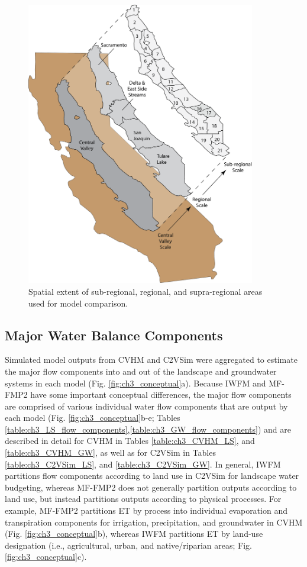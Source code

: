 \begin{figure}[ht!]
\centerline{\includegraphics[width=100mm,keepaspectratio]{ch3_figs/CV_subregions_fig_Alvar_040819.png}}
\caption{Spatial extent of sub-regional, regional, and supra-regional areas used for model comparison.}
\label{fig:ch3_regions}
\end{figure}

\subsection{Major Water Balance Components}

Simulated model outputs from CVHM and C2VSim were aggregated to estimate the major flow components into and out of the landscape and groundwater systems in each model (Fig. \ref{fig:ch3_conceptual}a). Because IWFM and MF-FMP2 have some important conceptual differences, the major flow components are comprised of various individual water flow components that are output by each model (Fig. \ref{fig:ch3_conceptual}b-e; Tables \ref{table:ch3_LS_flow_components},\ref{table:ch3_GW_flow_components}) and are described in detail for CVHM in Tables \ref{table:ch3_CVHM_LS}, and \ref{table:ch3_CVHM_GW}, as well as for C2VSim in Tables \ref{table:ch3_C2VSim_LS}, and \ref{table:ch3_C2VSim_GW}. In general, IWFM partitions flow components according to land use in C2VSim for landscape water budgeting, whereas MF-FMP2 does not generally partition outputs according to land use, but instead partitions outputs according to physical processes. For example, MF-FMP2 partitions ET by process into individual evaporation and transpiration components for irrigation, precipitation, and groundwater in CVHM (Fig. \ref{fig:ch3_conceptual}b), whereas IWFM partitions ET by land-use designation (i.e., agricultural, urban, and native/riparian areas; Fig. \ref{fig:ch3_conceptual}c).


